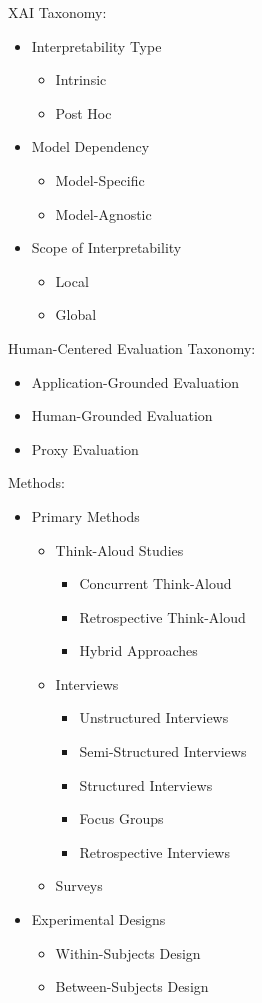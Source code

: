 XAI Taxonomy:
\begin{itemize}
    \item Interpretability Type
    \begin{itemize}
        \item Intrinsic
        \item Post Hoc
    \end{itemize}
    \item Model Dependency
    \begin{itemize}
        \item Model-Specific
        \item Model-Agnostic
    \end{itemize}
    \item Scope of Interpretability
    \begin{itemize}
        \item Local
        \item Global
    \end{itemize}
\end{itemize}


Human-Centered Evaluation Taxonomy:

\begin{itemize}
    \item Application-Grounded Evaluation
    \item Human-Grounded Evaluation
    \item Proxy Evaluation
\end{itemize}


Methods:
\begin{itemize}
    \item Primary Methods
    \begin{itemize}
        \item Think-Aloud Studies
        \begin{itemize}
            \item Concurrent Think-Aloud
            \item Retrospective Think-Aloud
            \item Hybrid Approaches
        \end{itemize}
        \item Interviews
        \begin{itemize}
            \item Unstructured Interviews
            \item Semi-Structured Interviews
            \item Structured Interviews
            \item Focus Groups
            \item Retrospective Interviews
        \end{itemize}
        \item Surveys
    \end{itemize}
    \item Experimental Designs
    \begin{itemize}
        \item Within-Subjects Design
        \item Between-Subjects Design
    \end{itemize}
\end{itemize}
   

